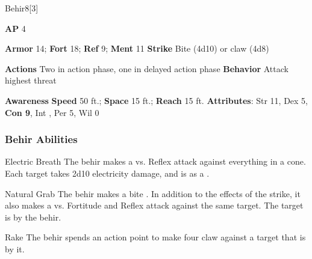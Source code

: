 \begin{monsection}{Behir}{8}[3]
\vspace{-1em}\vspace{-1em}
\begin{spellcontent}
\begin{spelltargetinginfo}
{\textbf{AP} 4}

\pari \textbf{Armor} 14;
\textbf{Fort} 18;
\textbf{Ref} 9;
\textbf{Ment} 11
\pari \textbf{Strike} Bite  (4d10) or claw  (4d8)


\pari \textbf{Actions} Two in action phase, one in delayed action phase
\pari \textbf{Behavior} Attack highest threat
\end{spelltargetinginfo}
\end{spellcontent}

\begin{monsterfooter}
\pari \textbf{Awareness} 
\pari \textbf{Speed} 50 ft.;
\textbf{Space} 15 ft.;
\textbf{Reach} 15 ft.
\pari \textbf{Attributes}:
Str 11,
Dex 5,
\textbf{Con 9},
Int ,
Per 5,
Wil 0
\end{monsterfooter}
\end{monsection}


\subsubsection{Behir Abilities}

\begin{ability}{Electric Breath}
The behir makes a  vs. Reflex attack against everything in a \areamed cone.
\hit Each target takes 2d10 electricity damage, and is  as a .
\end{ability}

\vspace{0.5em}
\begin{ability}{Natural Grab}
The behir makes a bite .
In addition to the effects of the strike, it also makes a  vs. Fortitude and Reflex attack against the same target.
\hit The target is  by the behir.
\end{ability}

\vspace{0.5em}
\begin{ability}{Rake}
The behir spends an action point to make four claw  against a target that is  by it.
\end{ability}






